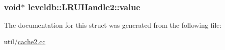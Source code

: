 \subsubsection[{value}]{\setlength{\rightskip}{0pt plus 5cm}void$\ast$ leveldb\+::\+L\+R\+U\+Handle2\+::value}\label{structleveldb_1_1_l_r_u_handle2_a3ffe79f1bd110090a6ab07aee282df9c}


The documentation for this struct was generated from the following file\+:\begin{DoxyCompactItemize}
\item 
util/\hyperlink{cache2_8cc}{cache2.\+cc}\end{DoxyCompactItemize}
